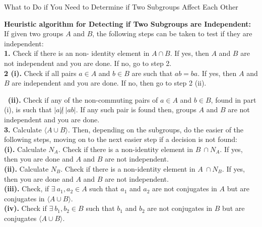 \documentclass{article}
\begin{document}
	\begin{section}{What to Do if You Need to Determine if Two Subgroups Affect Each Other} \label{S5}
		
		\textbf{Heuristic algorithm for Detecting if Two Subgroups are Independent:}\\
		
		If given two groups $A$ and $B$, the following steps can be taken to test if they are independent:\\ 
		
		\textbf{1. }Check if there is an non- identity element in $A \cap B$. If yes, then $A$ and $B$ are not independent and you are done. If no, go to step 2.\\
		
		
		\textbf{2 (i).} Check if all pairs $a \in A$ and $b \in B$ are such that $ab = ba$. If yes, then $A$ and $B$ are independent and you are done. If no, then go to step 2 (ii).
		
		$\ $\textbf{ (ii).} Check if any of the  non-commuting pairs of $a \in A$ and $b \in B$, found in part (i), is such that $|a|  \not| \ |ab|$. If any such pair is found then, groups $A$ and $B$ are not independent and you are done.\\
		
		\textbf{3.} Calculate $\langle A \cup B\rangle $.  Then,  depending on the subgroups, do the easier of the following steps,  moving on to the next easier step if a decision is not found:\\
		
		\textbf{(i).} Calculate  $N_A $.  Check if there is a non-identity element in $ B \ \cap N_A $. If yes, then you are done and $A$ and $B$ are not independent. \\
		
		\textbf{(ii).} Calculate $N_B $. Check if there is a non-identity element in $ A \ \cap  N_B $. If yes, then you are done and $A$ and $B$ are not independent.\\
		
		\textbf{(iii).}  Check,  if $ \exists \ a_1, a_2 \in A$ such that $a_1$ and $a_2$ are not conjugates in $A$ but are conjugates in $\langle A \cup B\rangle $.\\
		
		\textbf{(iv).} Check if $ \exists \ b_1, b_2 \in B$ such that $b_1$ and $b_2$ are not conjugates in $B$  but are  conjugates $\langle A \cup B\rangle $.\\
		
		
		

\end{section}
\end{document}
